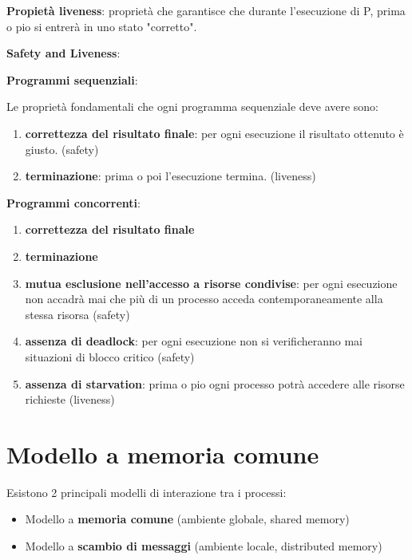 \documentclass{article}
\begin{document}
\textbf{Propietà liveness}: proprietà che garantisce che durante l'esecuzione di P, prima o pio si entrerà in uno stato "corretto".

\vspace{5mm}
\textbf{Safety and Liveness}:

\textbf{Programmi sequenziali}:

Le proprietà fondamentali che ogni programma sequenziale deve avere sono:
\begin{enumerate}
    \item \textbf{correttezza del risultato finale}: per ogni esecuzione il risultato ottenuto è giusto. (safety)
    \item \textbf{terminazione}: prima o poi l'esecuzione termina. (liveness)
\end{enumerate}

\vspace{5mm}
\textbf{Programmi concorrenti}:

\begin{enumerate}
    \item \textbf{correttezza del risultato finale}
    \item \textbf{terminazione}
    \item \textbf{mutua esclusione nell'accesso a risorse condivise}: per ogni esecuzione non accadrà mai che più di un processo acceda contemporaneamente alla stessa risorsa (safety)
    \item \textbf{assenza di deadlock}: per ogni esecuzione non si verificheranno mai situazioni di blocco critico (safety)
    \item \textbf{assenza di starvation}: prima o pio ogni processo potrà accedere alle risorse richieste (liveness)
\end{enumerate}

\newpage

\section{Modello a memoria comune}

Esistono 2 principali modelli di interazione tra i processi:
\begin{itemize}
    \item Modello a \textbf{memoria comune} (ambiente globale, shared memory)
    \item Modello a \textbf{scambio di messaggi} (ambiente locale, distributed memory)
\end{itemize}
\end{document}
